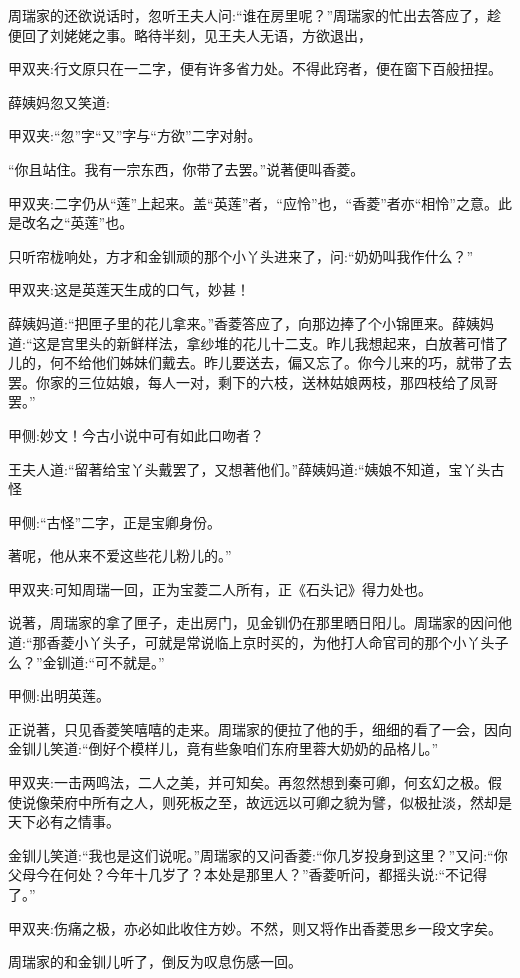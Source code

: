 \begin{parag}
    周瑞家的还欲说话时，忽听王夫人问:“谁在房里呢？”周瑞家的忙出去答应了，趁便回了刘姥姥之事。略待半刻，见王夫人无语，方欲退出，\begin{note}甲双夹:行文原只在一二字，便有许多省力处。不得此窍者，便在窗下百般扭捏。\end{note}薛姨妈忽又笑道:\begin{note}甲双夹:“忽”字“又”字与“方欲”二字对射。\end{note}“你且站住。我有一宗东西，你带了去罢。”说著便叫香菱。\begin{note}甲双夹:二字仍从“莲”上起来。盖“英莲”者，“应怜”也，“香菱”者亦“相怜”之意。此是改名之“英莲”也。\end{note}只听帘栊响处，方才和金钏顽的那个小丫头进来了，问:“奶奶叫我作什么？”\begin{note}甲双夹:这是英莲天生成的口气，妙甚！\end{note}薛姨妈道:“把匣子里的花儿拿来。”香菱答应了，向那边捧了个小锦匣来。薛姨妈道:“这是宫里头的新鲜样法，拿纱堆的花儿十二支。昨儿我想起来，白放著可惜了儿的，何不给他们姊妹们戴去。昨儿要送去，偏又忘了。你今儿来的巧，就带了去罢。你家的三位姑娘，每人一对，剩下的六枝，送林姑娘两枝，那四枝给了凤哥罢。”\begin{note}甲侧:妙文！今古小说中可有如此口吻者？\end{note}王夫人道:“留著给宝丫头戴罢了，又想著他们。”薛姨妈道:“姨娘不知道，宝丫头古怪\begin{note}甲侧:“古怪”二字，正是宝卿身份。\end{note}著呢，他从来不爱这些花儿粉儿的。”\begin{note}甲双夹:可知周瑞一回，正为宝菱二人所有，正《石头记》得力处也。\end{note}
\end{parag}


\begin{parag}
    说著，周瑞家的拿了匣子，走出房门，见金钏仍在那里晒日阳儿。周瑞家的因问他道:“那香菱小丫头子，可就是常说临上京时买的，为他打人命官司的那个小丫头子么？”金钏道:“可不就是。”\begin{note}甲侧:出明英莲。\end{note}正说著，只见香菱笑嘻嘻的走来。周瑞家的便拉了他的手，细细的看了一会，因向金钏儿笑道:“倒好个模样儿，竟有些象咱们东府里蓉大奶奶的品格儿。”\begin{note}甲双夹:一击两鸣法，二人之美，并可知矣。再忽然想到秦可卿，何玄幻之极。假使说像荣府中所有之人，则死板之至，故远远以可卿之貌为譬，似极扯淡，然却是天下必有之情事。\end{note}金钏儿笑道:“我也是这们说呢。”周瑞家的又问香菱:“你几岁投身到这里？”又问:“你父母今在何处？今年十几岁了？本处是那里人？”香菱听问，都摇头说:“不记得了。”\begin{note}甲双夹:伤痛之极，亦必如此收住方妙。不然，则又将作出香菱思乡一段文字矣。\end{note}周瑞家的和金钏儿听了，倒反为叹息伤感一回。
\end{parag}


